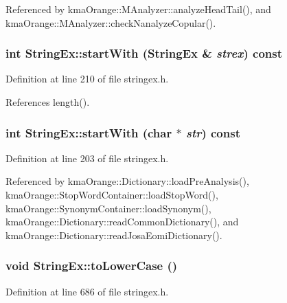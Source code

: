 Referenced by kmaOrange::MAnalyzer::analyzeHeadTail(), and kmaOrange::MAnalyzer::checkNanalyzeCopular().\hypertarget{classStringEx_06ae2efd90272ae17cfb1280ebcc4a87}{
\subsubsection[{startWith}]{\setlength{\rightskip}{0pt plus 5cm}int StringEx::startWith ({\bf StringEx} \& {\em strex}) const}}
\label{classStringEx_06ae2efd90272ae17cfb1280ebcc4a87}




Definition at line 210 of file stringex.h.

References length().\hypertarget{classStringEx_2f853993f378542f2ff7c15ad9c33c83}{
\subsubsection[{startWith}]{\setlength{\rightskip}{0pt plus 5cm}int StringEx::startWith (char $\ast$ {\em str}) const}}
\label{classStringEx_2f853993f378542f2ff7c15ad9c33c83}




Definition at line 203 of file stringex.h.

Referenced by kmaOrange::Dictionary::loadPreAnalysis(), kmaOrange::StopWordContainer::loadStopWord(), kmaOrange::SynonymContainer::loadSynonym(), kmaOrange::Dictionary::readCommonDictionary(), and kmaOrange::Dictionary::readJosaEomiDictionary().\hypertarget{classStringEx_a8111c5edd12e94d7f6e470ccb4f0ba7}{
\subsubsection[{toLowerCase}]{\setlength{\rightskip}{0pt plus 5cm}void StringEx::toLowerCase ()}}
\label{classStringEx_a8111c5edd12e94d7f6e470ccb4f0ba7}




Definition at line 686 of file stringex.h.

